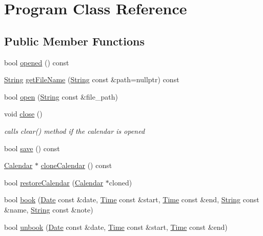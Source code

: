 \hypertarget{classProgram}{}\section{Program Class Reference}
\label{classProgram}
\subsection*{Public Member Functions}
\begin{DoxyCompactItemize}
\item 
bool \hyperlink{classProgram_a2f494b9e0a50657ac89a61a96e92face}{opened} () const
\item 
\hyperlink{classString}{String} \hyperlink{classProgram_a78c686e8f768666e0377b23317134b4a}{get\+File\+Name} (\hyperlink{classString}{String} const \&path=nullptr) const
\item 
bool \hyperlink{classProgram_a4658796d44178138e3c50df2346f20c9}{open} (\hyperlink{classString}{String} const \&file\+\_\+path)
\item 
\mbox{\label{classProgram_ab8b7a28d1be3f1b8c5136e936c75ca63}} 
void \hyperlink{classProgram_ab8b7a28d1be3f1b8c5136e936c75ca63}{close} ()
\begin{DoxyCompactList}\small\item\em calls clear() method if the calendar is opened \end{DoxyCompactList}\item 
bool \hyperlink{classProgram_a9ab390cc3caa8cc7dee9704a273a6979}{save} () const
\item 
\hyperlink{classCalendar}{Calendar} $\ast$ \hyperlink{classProgram_ae2bc41544b2cedf95611867ead89d6c9}{clone\+Calendar} () const
\item 
bool \hyperlink{classProgram_a0c4c553237a075bc9ab5d4c6b80b4471}{restore\+Calendar} (\hyperlink{classCalendar}{Calendar} $\ast$cloned)
\item 
bool \hyperlink{classProgram_a3fd5b4cf3d1eaa58809f593ccdc7a2d3}{book} (\hyperlink{classDate}{Date} const \&date, \hyperlink{classTime}{Time} const \&start, \hyperlink{classTime}{Time} const \&end, \hyperlink{classString}{String} const \&name, \hyperlink{classString}{String} const \&note)
\item 
bool \hyperlink{classProgram_a86a0e7e6c345dd50643cc6f466fb965a}{unbook} (\hyperlink{classDate}{Date} const \&date, \hyperlink{classTime}{Time} const \&start, \hyperlink{classTime}{Time} const \&end)
\item 

\end{DoxyCompactItemize}
